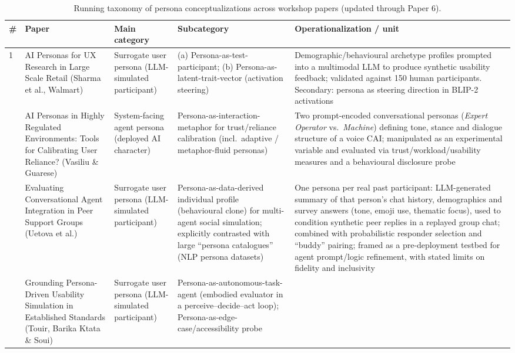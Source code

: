 \begin{table}[t]
\centering
\caption{Running taxonomy of persona conceptualizations across workshop papers (updated through Paper 6).}
\label{tab:persona-taxonomy}
\small
\begin{tabular}{p{0.5cm} p{3.6cm} p{3.4cm} p{3.6cm} p{3.6cm}}
\toprule
\textbf{\#} & \textbf{Paper} & \textbf{Main category} & \textbf{Subcategory} & \textbf{Operationalization / unit} \\
\midrule
1 & AI Personas for UX Research in Large Scale Retail (Sharma et al., Walmart) &
Surrogate user persona (LLM-simulated participant) &
(a) Persona-as-test-participant; (b) Persona-as-latent-trait-vector (activation steering) &
Demographic/behavioural archetype profiles prompted into a multimodal LLM to produce synthetic usability feedback; validated against 150 human participants. Secondary: persona as steering direction in BLIP-2 activations \\
\addlinespace
2 & AI Personas in Highly Regulated Environments: Tools for Calibrating User Reliance? (Vasiliu \& Guarese) &
System-facing agent persona (deployed AI character) &
Persona-as-interaction-metaphor for trust/reliance calibration (incl.\ adaptive / metaphor-fluid personas) &
Two prompt-encoded conversational personas (\textit{Expert Operator} vs.\ \textit{Machine}) defining tone, stance and dialogue structure of a voice CAI; manipulated as an experimental variable and evaluated via trust/workload/usability measures and a behavioural disclosure probe \\
\addlinespace
3 & Evaluating Conversational Agent Integration in Peer Support Groups (Uetova et al.) &
Surrogate user persona (LLM-simulated participant) &
Persona-as-data-derived individual profile (behavioural clone) for multi-agent social simulation; explicitly contrasted with large ``persona catalogues'' (NLP persona datasets) &
One persona per real past participant: LLM-generated summary of that person's chat history, demographics and survey answers (tone, emoji use, thematic focus), used to condition synthetic peer replies in a replayed group chat; combined with probabilistic responder selection and ``buddy'' pairing; framed as a pre-deployment testbed for agent prompt/logic refinement, with stated limits on fidelity and inclusivity \\
\addlinespace
4 & Grounding Persona-Driven Usability Simulation in Established Standards (Touir, Barika Ktata \& Soui) &
Surrogate user persona (LLM-simulated participant) &
Persona-as-autonomous-task-agent (embodied evaluator in a perceive--decide--act loop); Persona-as-edge-case/accessibility probe &

\end{tabular}
\end{table}
